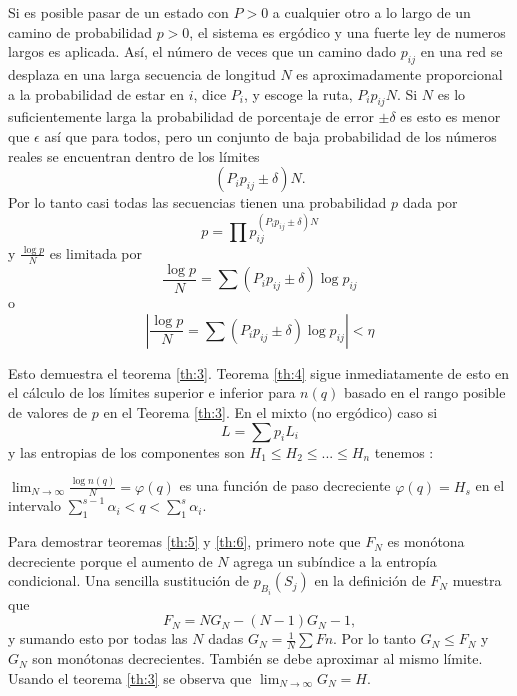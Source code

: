 \begin{appendices}
Si es posible pasar de un estado con $P>0$ a cualquier otro a lo largo
de un camino de probabilidad $p>0$, el sistema es erg\'odico y una
fuerte ley de numeros largos es aplicada.  As\'i, el n\'umero de veces
que un camino dado $p_{ij}$ en una red se desplaza en una larga
secuencia de longitud $N$ es aproximadamente proporcional a la
probabilidad de estar en $i$, dice $P_{i}$, y escoge la ruta,
$P_{i}p_{ij}N$. Si $N$ es lo suficientemente larga la probabilidad de
porcentaje de error $\pm\delta$ es esto es menor que $\epsilon$ as\'i
que para todos, pero un conjunto de baja probabilidad de los n\'umeros
reales se encuentran dentro de los l\'imites
\begin{equation}
(P_{i}p_{ij}\pm \delta)N.
\end{equation}
Por lo tanto casi todas las secuencias tienen una probabilidad $p$ dada
por
\begin{equation}
p=\prod p_{ij}^{(P_{i}p_{ij}\pm \delta)N}
\end{equation}
y $\frac{\log  p}{N}$ es limitada por
\begin{equation}
\frac{\log  p}{N} = \sum (P_{i}p_{ij}\pm \delta)\log  p_{ij}
\end{equation}
o
\begin{equation}
\left|\frac{\log  p}{N} = \sum (P_{i}p_{ij}\pm \delta)\log p_{ij}\right|<\eta
\end{equation}

Esto demuestra el teorema \ref{th:3}. Teorema \ref{th:4} sigue
inmediatamente de esto en el c\'alculo de los l\'imites superior e
inferior para $n(q)$ basado en el rango posible de valores de $p$ en
el Teorema \ref{th:3}.  En el mixto (no erg\'{o}dico) caso si
\begin{equation}
L = \sum p_{i}L_{i}
\end{equation}
y las entropias de los componentes son $H_{1}\leq H_{2}\leq ... \leq
H_{n}$ tenemos :
\begin{theorem}
$\lim_{N\rightarrow \infty }\frac{\log n(q)}{N}=\varphi (q)$ es una
funci\'on de paso decreciente $\varphi (q)=H_{s}$ en el intervalo
$\sum_{1}^{s-1}\alpha_{i}<q<\sum_{1}^{s}\alpha_{i}$.
\label{nuevo}
\end{theorem}

Para demostrar teoremas \ref{th:5} y \ref{th:6}, primero note que
$F_{N}$ es mon\'otona decreciente porque el aumento de $N$ agrega un
sub\'indice a la entrop\'ia condicional. Una sencilla sustituci\'{o}n
de $p_{B_{i}}(S_{j})$ en la definici\'on de $F_{N}$ muestra que
\begin{equation}
F_{N} = NG_{N}-(N-1)G_{N}-1,
\end{equation}
y sumando esto por todas las $N$ dadas $G_{N}=\frac{1}{N}\sum
F{n}$. Por lo tanto $G_{N}\leq F_{N}$ y $G_{N}$ son mon\'{o}tonas
decrecientes. Tambi\'en se debe aproximar al mismo l\'imite. Usando el
teorema \ref{th:3} se observa que $\lim_{N\rightarrow \infty } G_{N} =
H$.


\end{appendices}

